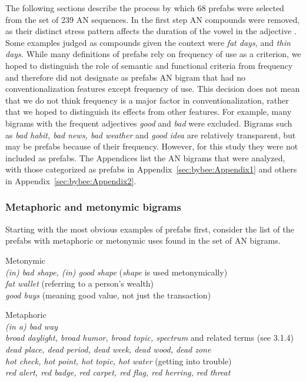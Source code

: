 \documentclass[output=paper]{langscibook}
\begin{document}
The following sections describe the process by which  68 prefabs were selected from the set of 239 AN sequences. In the first step AN compounds were removed, as their distinct stress pattern affects the duration of the vowel in the adjective \citep{Morrill2011}. Some examples judged as compounds given the context were \textit{fat days,} and \textit{thin days.} While many definitions of prefabs rely on frequency of use as a criterion, we hoped to distinguish the role of semantic and functional criteria from frequency and therefore did not designate as prefabs AN bigram that had no conventionalization features except frequency of use. This decision does not mean that we do not think frequency is a major factor in conventionalization, rather that we hoped to distinguish its effects from other features. For example, many bigrams with the frequent adjectives \textit{good} and \textit{bad} were excluded. Bigrams such as \textit{bad habit, bad news, bad weather} and \textit{good idea} are relatively transparent, but may be prefabs because of their frequency. However, for this study they were not included as prefabs. The Appendices list the AN bigrams that were analyzed, with those categorized as prefabs in Appendix~\ref{sec:bybee:Appendix1} and others in Appendix~\ref{sec:bybee:Appendix2}. 

\subsubsection{Metaphoric and metonymic bigrams}\label{sec:bybee:3.1.2}

Starting with the most obvious examples of prefabs first, consider the list of the prefabs with metaphoric or metonymic uses found in the set of AN bigrams.

\ea\label{ex:bybee:3}Metonymic\\
\textit{(in) bad shape, (in) good shape} (\textit{shape} is used metonymically)\\
\textit{fat wallet} (referring to a person’s wealth)\\
\textit{good buys} (meaning good value, not just the transaction)

\ex \label{ex:bybee:4}Metaphoric\\
\textit{(in a) bad way}\\
\textit{broad daylight, broad humor, broad topic, spectrum} and related terms (see 3.1.4)\\
\textit{dead place, dead period, dead week, dead wood, dead zone}\\
\textit{hot check, hot point, hot topic, hot water} (getting into trouble)\\
\textit{red alert, red badge, red carpet, red flag, red herring, red threat}
\z
\end{document}

